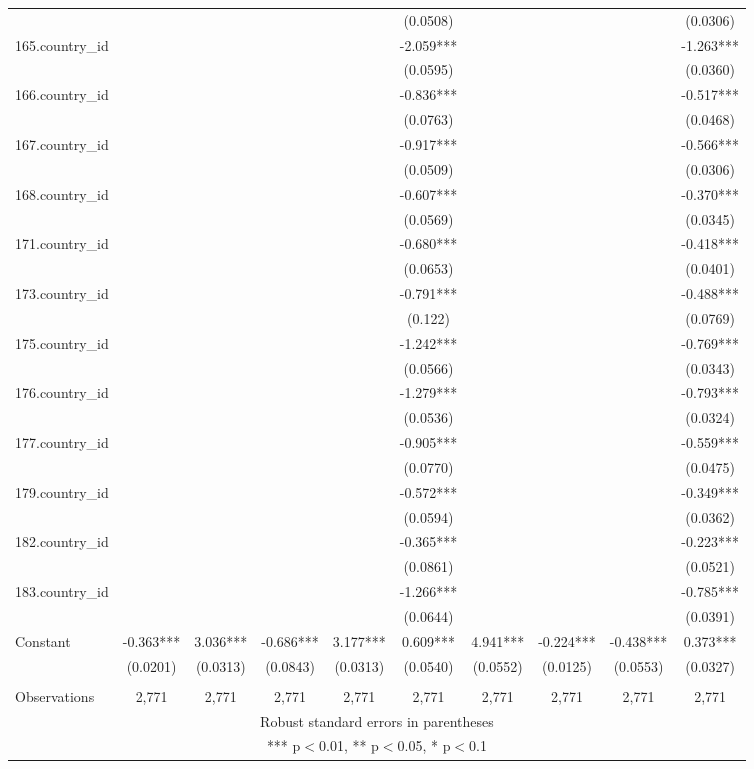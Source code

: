 \documentclass[]{article}
\begin{document}
\begin{tabular}{lccccccccc}
 &  &  &  &  & (0.0508) &  &  &  & (0.0306) \\
165.country\_id &  &  &  &  & -2.059*** &  &  &  & -1.263*** \\
 &  &  &  &  & (0.0595) &  &  &  & (0.0360) \\
166.country\_id &  &  &  &  & -0.836*** &  &  &  & -0.517*** \\
 &  &  &  &  & (0.0763) &  &  &  & (0.0468) \\
167.country\_id &  &  &  &  & -0.917*** &  &  &  & -0.566*** \\
 &  &  &  &  & (0.0509) &  &  &  & (0.0306) \\
168.country\_id &  &  &  &  & -0.607*** &  &  &  & -0.370*** \\
 &  &  &  &  & (0.0569) &  &  &  & (0.0345) \\
171.country\_id &  &  &  &  & -0.680*** &  &  &  & -0.418*** \\
 &  &  &  &  & (0.0653) &  &  &  & (0.0401) \\
173.country\_id &  &  &  &  & -0.791*** &  &  &  & -0.488*** \\
 &  &  &  &  & (0.122) &  &  &  & (0.0769) \\
175.country\_id &  &  &  &  & -1.242*** &  &  &  & -0.769*** \\
 &  &  &  &  & (0.0566) &  &  &  & (0.0343) \\
176.country\_id &  &  &  &  & -1.279*** &  &  &  & -0.793*** \\
 &  &  &  &  & (0.0536) &  &  &  & (0.0324) \\
177.country\_id &  &  &  &  & -0.905*** &  &  &  & -0.559*** \\
 &  &  &  &  & (0.0770) &  &  &  & (0.0475) \\
179.country\_id &  &  &  &  & -0.572*** &  &  &  & -0.349*** \\
 &  &  &  &  & (0.0594) &  &  &  & (0.0362) \\
182.country\_id &  &  &  &  & -0.365*** &  &  &  & -0.223*** \\
 &  &  &  &  & (0.0861) &  &  &  & (0.0521) \\
183.country\_id &  &  &  &  & -1.266*** &  &  &  & -0.785*** \\
 &  &  &  &  & (0.0644) &  &  &  & (0.0391) \\
Constant & -0.363*** & 3.036*** & -0.686*** & 3.177*** & 0.609*** & 4.941*** & -0.224*** & -0.438*** & 0.373*** \\
 & (0.0201) & (0.0313) & (0.0843) & (0.0313) & (0.0540) & (0.0552) & (0.0125) & (0.0553) & (0.0327) \\
 &  &  &  &  &  &  &  &  &  \\
 Observations & 2,771 & 2,771 & 2,771 & 2,771 & 2,771 & 2,771 & 2,771 & 2,771 & 2,771 \\ \hline
\multicolumn{10}{c}{ Robust standard errors in parentheses} \\
\multicolumn{10}{c}{ *** p$<$0.01, ** p$<$0.05, * p$<$0.1} \\
\end{tabular}
\end{document}
